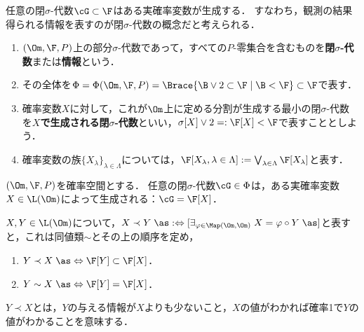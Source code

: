 \documentclass[uplatex,dvipdfmx]{jsreport}
\begin{document}
\begin{tcolorbox}[colframe=ForestGreen, colback=ForestGreen!10!white,breakable,colbacktitle=ForestGreen!40!white,coltitle=black,fonttitle=\bfseries\sffamily,
title=]
    任意の閉$\sigma$-代数$\cG\subset\F$はある実確率変数が生成する．
    すなわち，観測の結果得られる情報を表すのが閉$\sigma$-代数の概念だと考えられる．
\end{tcolorbox}

\begin{definition}\mbox{}
    \begin{enumerate}
        \item $(\Om,\F,P)$上の部分$\sigma$-代数であって，すべての$P$-零集合を含むものを\textbf{閉$\sigma$-代数}または\textbf{情報}という．
        \item その全体を$\Phi=\Phi(\Om,\F,P)=\Brace{\B\lor2\subset\F\mid\B<\F}\subset\F$で表す．
        \item 確率変数$X$に対して，これが$\Om$上に定める分割が生成する最小の閉$\sigma$-代数を\textbf{$X$で生成される閉$\sigma$-代数}といい，$\sigma[X]\lor 2=:\F[X]<\F$で表すこととしよう．
        \item 確率変数の族$\{X_\lambda\}_{\lambda\in\Lambda}$については，$\F[X_\lambda,\lambda\in\Lambda]:=\bigvee_{\lambda\in\Lambda}\F[X_\lambda]$と表す．
    \end{enumerate}
\end{definition}

\begin{theorem}
    $(\Om,\F,P)$を確率空間とする．
    任意の閉$\sigma$-代数$\cG\in\Phi$は，ある実確率変数$X\in\L(\Om)$によって生成される：$\cG=\F[X]$．
\end{theorem}

\begin{proposition}
    $X,Y\in\L(\Om)$について，$X\prec Y\;\as:\Leftrightarrow [\exists_{\varphi\in\Map(\Om,\Om)}\;X=\varphi\circ Y\;\as]$と表すと，これは同値類$\sim$とその上の順序を定め，
    \begin{enumerate}
        \item $Y\prec X\;\as\Leftrightarrow\F[Y]\subset\F[X]$．
        \item $Y\sim X\;\as\Leftrightarrow\F[Y]=\F[X]$．
    \end{enumerate}
\end{proposition}
\begin{remarks}
    $Y\prec X$とは，$Y$の与える情報が$X$よりも少ないこと，$X$の値がわかれば確率1で$Y$の値がわかることを意味する．
\end{remarks}
\end{document}
